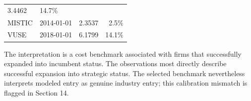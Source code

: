 \documentclass[10pt,]{article}
\begin{document}
\begin{longtable}[]{@{}llrr@{}}
\begin{minipage}[t]{0.26\columnwidth}
3.4462\strut
\end{minipage} & \begin{minipage}[t]{0.23\columnwidth}\raggedleft\strut
14.7\%\strut
\end{minipage}\tabularnewline
\begin{minipage}[t]{0.22\columnwidth}\raggedright\strut
MISTIC\strut
\end{minipage} & \begin{minipage}[t]{0.18\columnwidth}\raggedright\strut
2014-01-01\strut
\end{minipage} & \begin{minipage}[t]{0.26\columnwidth}\raggedleft\strut
2.3537\strut
\end{minipage} & \begin{minipage}[t]{0.23\columnwidth}\raggedleft\strut
2.5\%\strut
\end{minipage}\tabularnewline
\begin{minipage}[t]{0.22\columnwidth}\raggedright\strut
VUSE\strut
\end{minipage} & \begin{minipage}[t]{0.18\columnwidth}\raggedright\strut
2018-01-01\strut
\end{minipage} & \begin{minipage}[t]{0.26\columnwidth}\raggedleft\strut
6.1799\strut
\end{minipage} & \begin{minipage}[t]{0.23\columnwidth}\raggedleft\strut
14.1\%\strut
\end{minipage}\tabularnewline
\bottomrule
\end{longtable}

The interpretation is a cost benchmark associated with firms that
successfully expanded into incumbent status. The observations most
directly describe successful expansion into strategic status. The
selected benchmark nevertheless interprets modeled entry as genuine
industry entry; this calibration mismatch is flagged in Section 14.
\end{document}
